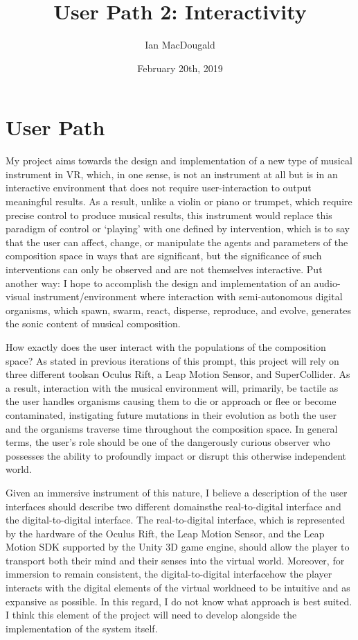 \documentclass[12pt]{article}
\title{User Path 2: Interactivity}
\author{Ian MacDougald}
\date{February 20th, 2019}
\begin{document}
	\setlength{\droptitle}{-10em}
	\maketitle
	\onehalfspacing
	\section*{User Path}
	
	My project aims towards the design and implementation of a new type of musical instrument in VR, which, in one sense, is not an instrument at all but is in an interactive environment that does not require user-interaction to output meaningful results. As a result, unlike a violin or piano or trumpet, which require precise control to produce musical results, this instrument would replace this paradigm of control or `playing' with one defined by intervention, which is to say that the user can affect, change, or manipulate the agents and parameters of the composition space in ways that are significant, but the significance of such interventions can only be observed and are not themselves interactive. Put another way: I hope to accomplish the design and implementation of an audio-visual instrument/environment where interaction with semi-autonomous digital organisms, which spawn, swarm, react, disperse, reproduce, and evolve, generates the sonic content of musical composition. 
	
	How exactly does the user interact with the populations of the composition space? As stated in previous iterations of this prompt, this project will rely on three different tools\textemdash an Oculus Rift, a Leap Motion Sensor, and SuperCollider. As a result, interaction with the musical environment will, primarily, be tactile as the user handles organisms causing them to die or approach or flee or become contaminated, instigating future mutations in their evolution as both the user and the organisms traverse time throughout the composition space. In general terms, the user's role should be one of the dangerously curious observer who possesses the ability to profoundly impact or disrupt this otherwise independent world. 
	
	Given an immersive instrument of this nature, I believe a description of the user interfaces should describe two different domains\textemdash the real-to-digital interface and the digital-to-digital interface. The real-to-digital interface, which is represented by the hardware of the Oculus Rift, the Leap Motion Sensor, and the Leap Motion SDK supported by the Unity 3D game engine, should allow the player to transport both their mind and their senses into the virtual world. Moreover, for immersion to remain consistent, the digital-to-digital interface\textemdash how the player interacts with the digital elements of the virtual world\textemdash need to be intuitive and as expansive as possible. In this regard, I do not know what approach is best suited. I think this element of the project will need to develop alongside the implementation of the system itself. 
\end{document}
